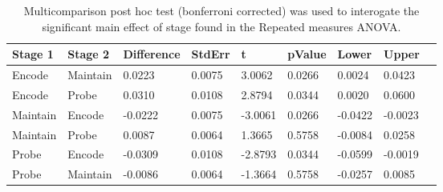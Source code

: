 \begin{table}
\centering
\begin{tabular}[0.2em]{@{}lllllllll@{}}\toprule
Stage 1 & Stage 2 & Difference & StdErr & t & pValue & Lower & Upper\\\toprule[0.2em]
Encode & Maintain & 0.0223 & 0.0075 & 3.0062 & 0.0266 & 0.0024 & 0.0423 \\\midrule
Encode & Probe & 0.0310 & 0.0108 & 2.8794 & 0.0344 & 0.0020 & 0.0600 \\\midrule
Maintain & Encode & -0.0222 & 0.0075 & -3.0061 & 0.0266 & -0.0422 & -0.0023 \\\midrule
Maintain & Probe & 0.0087 & 0.0064 & 1.3665 & 0.5758 & -0.0084 & 0.0258 \\\midrule
Probe & Encode & -0.0309 & 0.0108 & -2.8793 & 0.0344 & -0.0599 & -0.0019 \\\midrule
Probe & Maintain & -0.0086 & 0.0064 & -1.3664 & 0.5758 & -0.0257 & 0.0085 \\\bottomrule[0.2em]
\end{tabular}
\caption{Multicomparison post hoc test (bonferroni corrected) was used to interogate the significant main effect of stage found in the Repeated measures ANOVA.\label{tabel:tbl_RMAEFC2_PH_Stage}}
\end{table}
